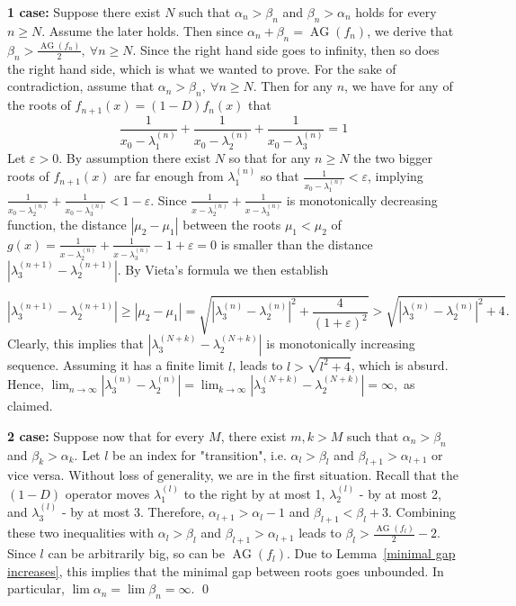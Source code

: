 \documentclass[11pt]{article}
\DeclareMathOperator{\AG}{AG}
\begin{document}
\textbf{1 case:} Suppose there exist $N$ such that $\alpha_n > \beta_n$ and $\beta_n > \alpha_n$ holds for every $n\geq N$. Assume the later holds. Then since $\alpha_n + \beta_n = \AG(f_n)$, we derive that $\beta_ n > \frac{\AG(f_n)}{2},~\forall n \geq N$. Since the right hand side goes to infinity, then so does the right hand side, which is what we wanted to prove. For the sake of contradiction, assume that $\alpha_n > \beta_n,~\forall n \geq N$. Then for any $n$, we have for any of the roots of $f_{n+1}(x) = (1-D)f_n(x)$ that
\[\frac{1}{x_0 - \lambda^{(n)}_1} + \frac{1}{x_0 - \lambda^{(n)}_2} + \frac{1}{x_0 - \lambda^{(n)}_3} = 1\]
Let $\varepsilon > 0$. By assumption there exist $N$ so that for any $n \geq N$ the two bigger roots of $f_{n+1}(x)$ are far enough from $\lambda^{(n)}_1$ so that $\frac{1}{x_0 - \lambda^{(n)}_1} < \varepsilon$, implying $\frac{1}{x_0 - \lambda^{(n)}_2} + \frac{1}{x_0 - \lambda^{(n)}_3} < 1 - \varepsilon$. Since $\frac{1}{x - \lambda^{(n)}_2} + \frac{1}{x - \lambda^{(n)}_3}$ is monotonically decreasing function, the distance $|\mu_2 - \mu_1|$ between the roots $\mu_1 < \mu_2$ of $g(x) = \frac{1}{x - \lambda^{(n)}_2} + \frac{1}{x - \lambda^{(n)}_3} - 1 + \varepsilon = 0$ is smaller than the distance $|\lambda^{(n+1)}_3 - \lambda^{(n+1)}_2|$. By Vieta's formula we then establish

\[|\lambda^{(n+1)}_3 - \lambda^{(n+1)}_2|\ge |\mu_2 - \mu_1| = \sqrt{|\lambda^{(n)}_3 - \lambda^{(n)}_2|^2 + \frac{4}{(1+\varepsilon)^2}} > \sqrt{|\lambda^{(n)}_3 - \lambda^{(n)}_2|^2 +4}.\]
Clearly, this implies that $|\lambda^{(N + k)}_3 - \lambda^{(N+k)}_2|$ is monotonically increasing sequence. Assuming it has a finite limit $l$, leads to $l > \sqrt{l^2 +4}$, which is absurd. Hence, $\lim_{n\to \infty} |\lambda^{(n)}_3 - \lambda^{(n)}_2|=\lim_{k\to \infty} |\lambda^{(N + k)}_3 - \lambda^{(N+k)}_2| = \infty,$ as claimed.

\textbf{2 case:}
Suppose now that for every $M$, there exist $m, k > M$ such that $\alpha_n > \beta_n$ and $\beta_k > \alpha_k$. Let $l$ be an index for "transition", i.e. $\alpha_l > \beta_l$ and $\beta_{l+1} > \alpha_{l+1}$ or vice versa. Without loss of generality, we are in the first situation. Recall that the $(1-D)$ operator moves $\lambda^{(l)}_{1}$ to the right by at most 1, $\lambda^{(l)}_{2}$ - by at most 2, and $\lambda^{(l)}_{3}$ - by at most 3. Therefore, $\alpha_{l+1} > \alpha_l - 1$ and $\beta_{l+1} < \beta_l + 3$. Combining these two inequalities with $\alpha_l > \beta_l$ and $\beta_{l+1} > \alpha_{l+1}$ leads to $\beta_l > \frac{\AG(f_l)}{2} - 2$. Since $l$ can be arbitrarily big, so can be $\AG(f_l)$. Due to Lemma~\ref{minimal gap increases}, this implies that the minimal gap between roots goes unbounded. In particular, $\lim \alpha_n = \lim \beta_n = \infty$.
\qed
\end{document}
